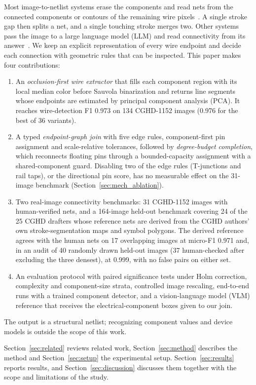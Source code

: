 \documentclass[journal]{IEEEtran}
\begin{document}
Most image-to-netlist systems erase the components and read nets from the connected components or contours of the remaining wire pixels~\cite{sina2026,peker2026}. A single stroke gap then splits a net, and a single touching stroke merges two. Other systems pass the image to a large language model (LLM) and read connectivity from its answer~\cite{masalachai2024}. We keep an explicit representation of every wire endpoint and decide each connection with geometric rules that can be inspected. This paper makes four contributions:
\begin{enumerate}
\item An \emph{occlusion-first wire extractor} that fills each component region with its local median color before Sauvola binarization and returns line segments whose endpoints are estimated by principal component analysis (PCA). It reaches wire-detection F1 0.973 on 134 CGHD-1152 images (0.976 for the best of 36 variants).
\item A typed \emph{endpoint-graph join} with five edge rules, component-first pin assignment and scale-relative tolerances, followed by \emph{degree-budget completion}, which reconnects floating pins through a bounded-capacity assignment with a shared-component guard. Disabling two of the edge rules (T-junctions and rail taps), or the directional pin score, has no measurable effect on the 31-image benchmark (Section~\ref{sec:mech_ablation}).
\item Two real-image connectivity benchmarks: 31 CGHD-1152 images with human-verified nets, and a 164-image held-out benchmark covering 24 of the 25 CGHD drafters whose reference nets are derived from the CGHD authors' own stroke-segmentation maps and symbol polygons. The derived reference agrees with the human nets on 17 overlapping images at micro-F1 0.971 and, in an audit of 40 randomly drawn held-out images (37 human-checked after excluding the three densest), at 0.999, with no false pairs on either set.
\item An evaluation protocol with paired significance tests under Holm correction, complexity and component-size strata, controlled image rescaling, end-to-end runs with a trained component detector, and a vision-language model (VLM) reference that receives the electrical-component boxes given to our join.
\end{enumerate}
The output is a structural netlist; recognizing component values and device models is outside the scope of this work.

Section~\ref{sec:related} reviews related work, Section~\ref{sec:method} describes the method and Section~\ref{sec:setup} the experimental setup. Section~\ref{sec:results} reports results, and Section~\ref{sec:discussion} discusses them together with the scope and limitations of the study.
\end{document}
